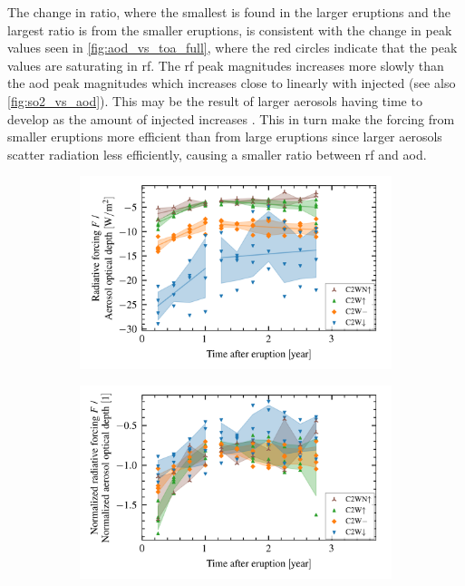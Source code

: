 \documentclass{ametsocV5}
\begin{document}
The change in ratio, where the smallest is found in the larger eruptions and the largest
ratio is from the smaller eruptions, is consistent with the change in peak values seen
in \cref{fig:aod_vs_toa_full}, where the red circles indicate that the peak values are
saturating in \ac{rf}. The \ac{rf} peak magnitudes increases more slowly than the
\ac{aod} peak magnitudes which increases close to linearly with injected  (see
also \cref{fig:so2_vs_aod}). This may be the result of larger aerosols having time to
develop as the amount of injected  increases \citep{niemeier2015,marshall2019}.
This in turn make the forcing from smaller eruptions more efficient than from large
eruptions since larger aerosols scatter radiation less efficiently, causing a smaller
ratio between \ac{rf} and \ac{aod}.

\begin{figure}
  \begin{subfigure}{\linewidth}
    \centering
    \includegraphics[width=0.95\linewidth]{figures/aod_vs_toa_avg_loop_ratio}
    \caption{}%
    \label{fig:aod_vs_toa_avg_loop_ratio}
  \end{subfigure}
  \begin{subfigure}{\linewidth}
    \centering
    \includegraphics[width=0.95\linewidth]{figures/aod_vs_toa_avg_loop_ratio_scaled}
    \caption{}%
    \label{fig:aod_vs_toa_avg_loop_ratio_scaled}
  \end{subfigure}


\end{figure}
\end{document}

